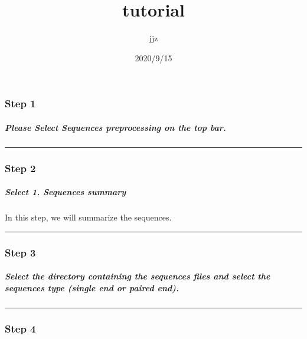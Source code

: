 \documentclass[]{article}
\title{tutorial}
\author{jjz}
\date{2020/9/15}
\let\oldsubparagraph\subparagraph
\renewcommand{\subparagraph}[1]{\oldsubparagraph{#1}\mbox{}}
\begin{document}
\maketitle

\hypertarget{step-1}{%
\subsubsection{Step 1}\label{step-1}}

\hypertarget{please-select-sequences-preprocessing-on-the-top-bar.}{%
\subparagraph{\texorpdfstring{Please Select \textbf{Sequences
preprocessing} on the top
bar.}{Please Select Sequences preprocessing on the top bar.}}\label{please-select-sequences-preprocessing-on-the-top-bar.}}

\begin{center}\rule{0.5\linewidth}{\linethickness}\end{center}

\hypertarget{step-2}{%
\subsubsection{Step 2}\label{step-2}}

\hypertarget{select-1.-sequences-summary}{%
\subparagraph{\texorpdfstring{Select \textbf{1. Sequences
summary}}{Select 1. Sequences summary}}\label{select-1.-sequences-summary}}

In this step, we will summarize the sequences.

\begin{center}\rule{0.5\linewidth}{\linethickness}\end{center}

\hypertarget{step-3}{%
\subsubsection{Step 3}\label{step-3}}

\hypertarget{select-the-directory-containing-the-sequences-files-and-select-the-sequences-type-single-end-or-paired-end.}{%
\subparagraph{Select the directory containing the sequences files and
select the sequences type (single end or paired
end).}\label{select-the-directory-containing-the-sequences-files-and-select-the-sequences-type-single-end-or-paired-end.}}

\begin{center}\rule{0.5\linewidth}{\linethickness}\end{center}

\hypertarget{step-4}{%
\subsubsection{Step 4}\label{step-4}}
\end{document}
